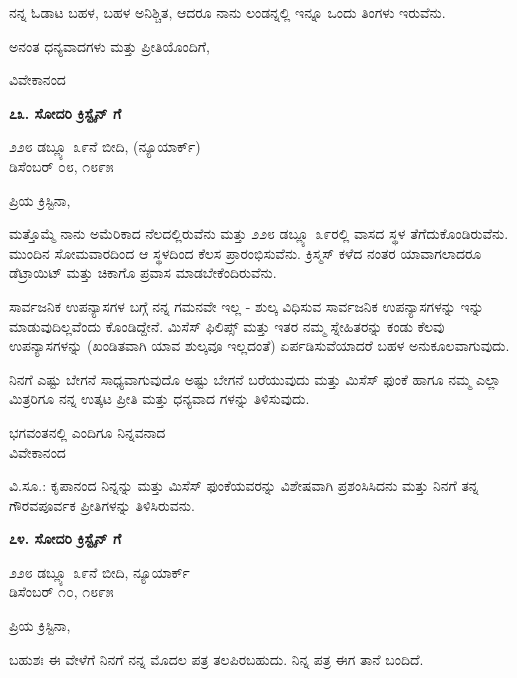 ನನ್ನ ಓಡಾಟ ಬಹಳ, ಬಹಳ ಅನಿಶ್ಚಿತ, ಆದರೂ ನಾನು ಲಂಡನ್ನಲ್ಲಿ ಇನ್ನೂ ಒಂದು ತಿಂಗಳು ಇರುವೆನು.

ಅನಂತ ಧನ್ಯವಾದಗಳು ಮತ್ತು ಪ್ರೀತಿಯೊಂದಿಗೆ,

\begin{flushright}
ವಿವೇಕಾನಂದ
\end{flushright}

\begin{center}
\textbf{೭೩. ಸೋದರಿ ಕ್ರಿಸ್ಟೈನ್ ಗೆ}
\end{center}

\begin{flushright}
೨೨೮ ಡಬ್ಲ್ಯೂ ೩೯ನೆ ಬೀದಿ, (ನ್ಯೂಯಾರ್ಕ್)\\ಡಿಸೆಂಬರ್ ೦೮, ೧೮೯೫
\end{flushright}

ಪ್ರಿಯ ಕ್ರಿಸ್ಟಿನಾ,

ಮತ್ತೊಮ್ಮೆ ನಾನು ಅಮೆರಿಕಾದ ನೆಲದಲ್ಲಿರುವೆನು ಮತ್ತು ೨೨೮ ಡಬ್ಲ್ಯೂ ೩೯ರಲ್ಲಿ ವಾಸದ ಸ್ಥಳ ತೆಗೆದುಕೊಂಡಿರುವೆನು. ಮುಂದಿನ ಸೋಮವಾರದಿಂದ ಆ ಸ್ಥಳದಿಂದ ಕೆಲಸ ಪ್ರಾರಂಭಿಸುವೆನು. ಕ್ರಿಸ್ಮಸ್ ಕಳೆದ ನಂತರ ಯಾವಾಗಲಾದರೂ ಡೆಟ್ರಾಯಿಟ್ ಮತ್ತು ಚಿಕಾಗೊ ಪ್ರವಾಸ ಮಾಡಬೇಕೆಂದಿರುವೆನು.

ಸಾರ್ವಜನಿಕ ಉಪನ್ಯಾಸಗಳ ಬಗ್ಗೆ ನನ್ನ ಗಮನವೇ ಇಲ್ಲ - ಶುಲ್ಕ ವಿಧಿಸುವ ಸಾರ್ವಜನಿಕ ಉಪನ್ಯಾಸಗಳನ್ನು ಇನ್ನು ಮಾಡುವುದಿಲ್ಲವೆಂದು ಕೊಂಡಿದ್ದೇನೆ. ಮಿಸೆಸ್ ಫಿಲಿಪ್ಸ್ ಮತ್ತು ಇತರ ನಮ್ಮ ಸ್ನೇಹಿತರನ್ನು ಕಂಡು ಕೆಲವು ಉಪನ್ಯಾಸಗಳನ್ನು (ಖಂಡಿತವಾಗಿ ಯಾವ ಶುಲ್ಕವೂ ಇಲ್ಲದಂತೆ) ಏರ್ಪಡಿಸುವೆಯಾದರೆ ಬಹಳ ಅನುಕೂಲವಾಗುವುದು.

ನಿನಗೆ ಎಷ್ಟು ಬೇಗನೆ ಸಾಧ್ಯವಾಗುವುದೊ ಅಷ್ಟು ಬೇಗನೆ ಬರೆಯುವುದು ಮತ್ತು ಮಿಸೆಸ್ ಫುಂಕೆ ಹಾಗೂ ನಮ್ಮ ಎಲ್ಲಾ ಮಿತ್ರರಿಗೂ ನನ್ನ ಉತ್ಕಟ ಪ್ರೀತಿ ಮತ್ತು ಧನ್ಯವಾದ ಗಳನ್ನು ತಿಳಿಸುವುದು.

\begin{flushright}
ಭಗವಂತನಲ್ಲಿ ಎಂದಿಗೂ ನಿನ್ನವನಾದ\\ವಿವೇಕಾನಂದ
\end{flushright}

ವಿ.ಸೂ.: ಕೃಪಾನಂದ ನಿನ್ನನ್ನು ಮತ್ತು ಮಿಸೆಸ್ ಫುಂಕೆಯವರನ್ನು ವಿಶೇಷವಾಗಿ ಪ್ರಶಂಸಿಸಿದನು ಮತ್ತು ನಿನಗೆ ತನ್ನ ಗೌರವಪೂರ್ವಕ ಪ್ರೀತಿಗಳನ್ನು ತಿಳಿಸಿರುವನು.

\begin{center}
\textbf{೭೪. ಸೋದರಿ ಕ್ರಿಸ್ಟೈನ್ ಗೆ}
\end{center}

\begin{flushright}
೨೨೮ ಡಬ್ಲ್ಯೂ ೩೯ನೆ ಬೀದಿ, ನ್ಯೂಯಾರ್ಕ್\\ಡಿಸೆಂಬರ್ ೧೦, ೧೮೯೫
\end{flushright}

ಪ್ರಿಯ ಕ್ರಿಸ್ಟಿನಾ,

ಬಹುಶಃ ಈ ವೇಳೆಗೆ ನಿನಗೆ ನನ್ನ ಮೊದಲ ಪತ್ರ ತಲಪಿರಬಹುದು. ನಿನ್ನ ಪತ್ರ ಈಗ ತಾನೆ ಬಂದಿದೆ.


